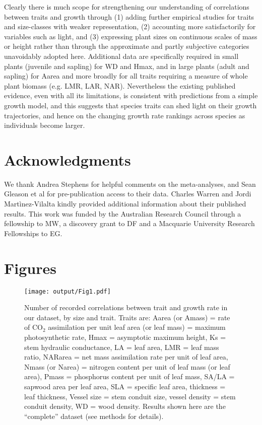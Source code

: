\documentclass[a4paper,11pt]{article}
\begin{document}
Clearly there is much scope for strengthening our understanding of correlations between traits and growth through (1) adding further empirical studies for traits and size-classes with weaker representation, (2) accounting more satisfactorily for variables such as light, and (3) expressing plant sizes on continuous scales of mass or height rather than through the approximate and partly subjective categories unavoidably adopted here. Additional data are specifically required in small plants (juvenile and sapling) for WD and Hmax, and in large plants (adult and sapling) for Aarea and more broadly for all traits requiring a measure of whole plant biomass (e.g. LMR, LAR, NAR). Nevertheless the existing published evidence, even with all its limitations, is consistent with predictions from a simple growth model, and this suggests that species traits can shed light on their growth trajectories, and hence on the changing growth rate rankings across species as individuals become larger.

\section*{Acknowledgments}\label{Acknowledgment}

We thank Andrea Stephens for helpful comments on the meta-analyses, and Sean Gleason et al for pre-publication access to their data. Charles Warren and Jordi Martìnez-Vilalta kindly provided additional information about their published results. This work was funded by the Australian Research Council through a fellowship to MW, a discovery grant to DF and a Macquarie University Research Fellowships to EG.

\clearpage
\linespread{1}

\nocite{*}

\label{references}


\clearpage
\section*{Figures}

\begin{figure}[h!]
\centering
\texttt{[image: output/Fig1.pdf]}
\caption{Number of recorded correlations between trait and growth rate in our dataset, by size and trait. Traits are: Aarea (or Amass) = rate of CO$_{2}$ assimilation per unit leaf area (or leaf mass) = maximum photosynthetic rate, Hmax = asymptotic maximum height,  Ks = stem hydraulic conductance, LA = leaf area, LMR = leaf mass ratio, NARarea = net mass assimilation rate per unit of leaf area, Nmass (or Narea) = nitrogen content per unit of leaf mass (or leaf area), Pmass = phosphorus content per unit of leaf mass, SA/LA = sapwood area per leaf area, SLA = specific leaf area, thickness = leaf thickness, Vessel size = stem conduit size, vessel density = stem conduit density, WD = wood density. Results shown here are the ``complete'' dataset (see methods for details).}
\label{fig:fig1}
\end{figure}
\end{document}

